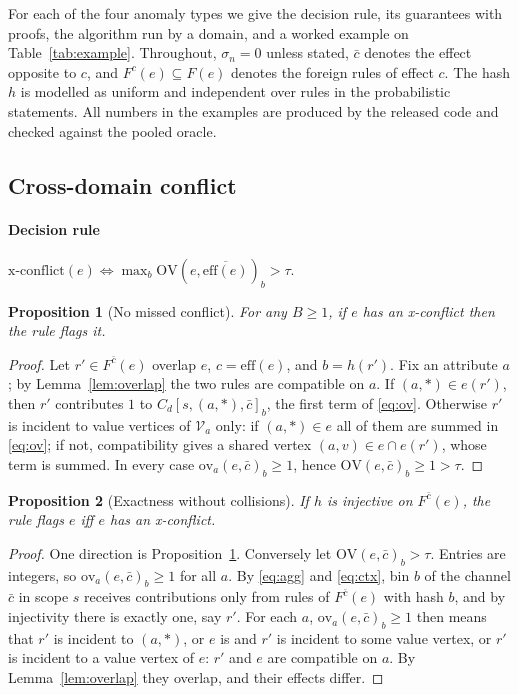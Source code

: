 \documentclass[preprint,12pt]{elsarticle}
\newtheorem{proposition}{Proposition}
\theoremstyle{definition}
\newcommand{\eff}{\mathrm{eff}}
\begin{document}
For each of the four anomaly types we give the decision rule, its guarantees with proofs, the algorithm run by a domain, and a worked example on Table~\ref{tab:example}. Throughout, $\sigma_{\!n}=0$ unless stated, $\bar c$ denotes the effect opposite to $c$, and $F^{c}(e)\subseteq F(e)$ denotes the foreign rules of effect $c$. The hash $h$ is modelled as uniform and independent over rules in the probabilistic statements. All numbers in the examples are produced by the released code and checked against the pooled oracle.

\subsection{Cross-domain conflict}
\label{sec:conflict}
\paragraph{Decision rule} $\text{x-conflict}(e)\iff\max_b\mathrm{OV}(e,\overline{\eff(e)})_b>\tau$.

\begin{proposition}[No missed conflict]
\label{thm:conf-complete}
For any $B\ge1$, if $e$ has an x-conflict then the rule flags it.
\end{proposition}
\begin{proof}
Let $r'\in F^{\bar c}(e)$ overlap $e$, $c=\eff(e)$, and $b=h(r')$. Fix an attribute $a$; by Lemma~\ref{lem:overlap} the two rules are compatible on $a$. If $(a,\ast)\in e(r')$, then $r'$ contributes $1$ to $C_d[s,(a,\ast),\bar c]_b$, the first term of \eqref{eq:ov}. Otherwise $r'$ is incident to value vertices of $\mathcal{V}_a$ only: if $(a,\ast)\in e$ all of them are summed in \eqref{eq:ov}; if not, compatibility gives a shared vertex $(a,v)\in e\cap e(r')$, whose term is summed. In every case $\mathrm{ov}_a(e,\bar c)_b\ge1$, hence $\mathrm{OV}(e,\bar c)_b\ge1>\tau$.
\end{proof}

\begin{proposition}[Exactness without collisions]
\label{thm:conf-exact}
If $h$ is injective on $F^{\bar c}(e)$, the rule flags $e$ iff $e$ has an x-conflict.
\end{proposition}
\begin{proof}
One direction is Proposition~\ref{thm:conf-complete}. Conversely let $\mathrm{OV}(e,\bar c)_b>\tau$. Entries are integers, so $\mathrm{ov}_a(e,\bar c)_b\ge1$ for all $a$. By \eqref{eq:agg} and \eqref{eq:ctx}, bin $b$ of the channel $\bar c$ in scope $s$ receives contributions only from rules of $F^{\bar c}(e)$ with hash $b$, and by injectivity there is exactly one, say $r'$. For each $a$, $\mathrm{ov}_a(e,\bar c)_b\ge1$ then means that $r'$ is incident to $(a,\ast)$, or $e$ is and $r'$ is incident to some value vertex, or $r'$ is incident to a value vertex of $e$: $r'$ and $e$ are compatible on $a$. By Lemma~\ref{lem:overlap} they overlap, and their effects differ.
\end{proof}
\end{document}
